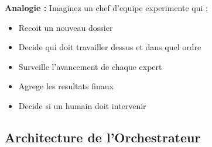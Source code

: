 \documentclass[a4paper,12pt]{article}
\begin{document}
\textbf{Analogie :} Imaginez un chef d'equipe experimente qui :
\begin{itemize}
    \item Recoit un nouveau dossier
    \item Decide qui doit travailler dessus et dans quel ordre
    \item Surveille l'avancement de chaque expert
    \item Agrege les resultats finaux
    \item Decide si un humain doit intervenir
\end{itemize}

\subsection{Architecture de l'Orchestrateur}
\end{document}
